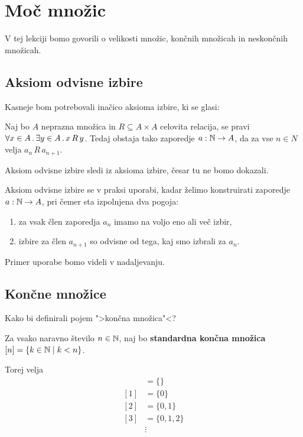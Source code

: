 \chapter{Moč množic}

V tej lekciji bomo govorili o velikosti množic, končnih množicah in neskončnih množicah.

\section{Aksiom odvisne izbire}

Kasneje bom potrebovali inačico aksioma izbire, ki se glasi:

\begin{aksiom}
  Naj bo $A$ neprazna množica in $R \subseteq A \times A$ celovita relacija, se pravi
  $\forall x \in A \,.\, \exists y \in A \,.\, x \, R \, y$.
  Tedaj obstaja tako zaporedje $a : \mathbb{N} \to A$, da za vse $n \in N$ velja $a_n \, R \,  a_{n+1}$.
\end{aksiom}

Aksiom odvisne izbire sledi iz aksioma izbire, česar tu ne bomo dokazali.

Aksiom odvisne izbire se v praksi uporabi, kadar želimo konstruirati zaporedje $a : \mathbb{N} \to A$, pri čemer sta izpolnjena dva pogoja:
%
\begin{enumerate}
\item za vsak člen zaporedja $a_n$ imamo na voljo eno ali več izbir,
\item izbire za člen $a_{n+1}$ so odvisne od tega, kaj smo izbrali za $a_n$.
\end{enumerate}
%
Primer uporabe bomo videli v nadaljevanju.

\section{Končne množice}

Kako bi definirali pojem ">končna množica"<?

\begin{definicija}
  Za vsako naravno število $n \in \mathbb{N}$, naj bo
  \textbf{standardna končna množica} $[n] = \left\{k \in \mathbb{N} \; \middle| \; k < n\right\}$.
\end{definicija}

\noindent
Torej velja
%
\begin{align*}
  [0] &= \{\} \\
  [1] &= \{0\} \\
  [2] &= \{0, 1\} \\
  [3] &= \{0, 1, 2\} \\
      &\vdots
\end{align*}

